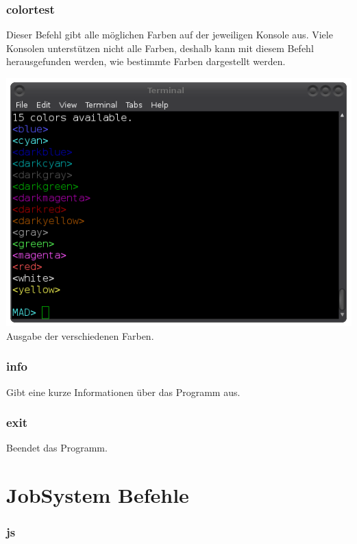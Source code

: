 \documentclass[12pt,a4paper]{report}
\begin{document}
\begin{onehalfspace}
\subsubsection{colortest}

Dieser Befehl gibt alle möglichen Farben auf der jeweiligen Konsole aus. Viele Konsolen unterstützen nicht alle Farben, deshalb kann mit diesem Befehl herausgefunden werden, wie bestimmte Farben dargestellt werden.

\begin{center}
\includegraphics[scale=0.5]{img/cli_colortest.png}\\
Ausgabe der verschiedenen Farben.
\end{center}

\subsubsection{info}

Gibt eine kurze Informationen über das Programm aus.

\subsubsection{exit}

Beendet das Programm.

\section{JobSystem Befehle}

\subsubsection{js}


\end{onehalfspace}
\end{document}
